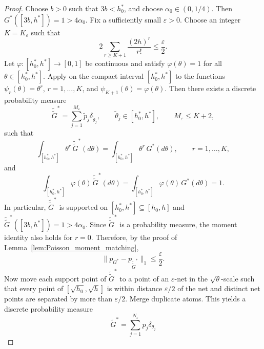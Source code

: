 \documentclass[twoside,12pt]{article}
\begin{document}
\begin{proof}
Choose $b>0$ such that $3b<h_0^\ast$, and choose $\alpha_0\in(0,1/4)$. Then $G^\ast([3b,h^\ast])=1>4\alpha_0$. Fix a sufficiently small $\varepsilon>0$. Choose an integer
$K=K_\varepsilon$ such that
\begin{displaymath}
2\sum_{r\geq K+1}\frac{(2h)^r}{r!}\le\frac{\varepsilon}{2}.
\end{displaymath}
Let $\varphi:[h_0^\ast,h^\ast]\to[0,1]$ be continuous and satisfy $\varphi(\theta)=1$ for all $\theta\in[h_0^\ast,h^\ast]$. Apply \citet[Lemma A.1]{Gho(01)} on the compact interval
$[h_0^\ast,h^\ast]$ to the functions $\psi_r(\theta)=\theta^r$, $r=1,\dots,K$, and $\psi_{K+1}(\theta)=\varphi(\theta)$. Then there exists a discrete
probability measure
\begin{displaymath}
\tilde{\tilde G}^\ast=\sum_{j=1}^{M_\varepsilon}\widetilde p_j\delta_{\widetilde\theta_j},\qquad\widetilde\theta_j\in[h_0^\ast,h^\ast],\qquad M_\varepsilon\le K+2,
\end{displaymath}
such that
\begin{displaymath}
\int_{[h_0^\ast,h^\ast]}\theta^r\,\tilde{\tilde G}^\ast(d\theta)=\int_{[h_0^\ast,h^\ast]}\theta^r\,G^\ast(d\theta),\qquad r=1,\dots,K,
\end{displaymath}
and
\begin{displaymath}
\int_{[h_0^\ast,h^\ast]}\varphi(\theta)\,\tilde{\tilde G}^\ast(d\theta)=\int_{[h_0^\ast,h^\ast]}\varphi(\theta)\,G^\ast(d\theta)=1.
\end{displaymath}
In particular, $\tilde{\tilde G}^\ast$ is supported on $[h_0^\ast,h^\ast]\subseteq[h_0,h]$ and $\tilde{\tilde G}^\ast([3b,h^\ast])=1>4\alpha_0$. Since $\tilde{\tilde G}^\ast$ is a probability measure, the moment identity also holds for $r=0$. Therefore, by the proof of Lemma~\ref{lem:Poisson_moment_matching},
\begin{displaymath}
\|p_{G^\ast}-p_{\tilde{\tilde G}^\ast}\|_1\le\frac{\varepsilon}{2}.
\end{displaymath}
Now move each support point of $\tilde{\tilde G}^\ast$ to a point of an $\varepsilon$-net in the $\sqrt{\theta}$-scale such that every point of $[\sqrt{h_0},\sqrt h]$ is within distance $\varepsilon/2$ of the net and distinct net points are separated by more than $\varepsilon/2$. Merge duplicate atoms. This yields a discrete probability measure
\begin{displaymath}
\tilde G^\ast=\sum_{j=1}^{N_\varepsilon}p_j\delta_{\theta_j}
\end{displaymath}

\end{proof}
\end{document}
